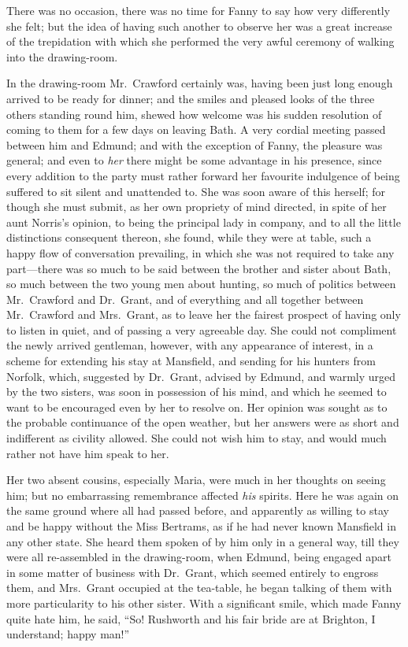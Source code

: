There was no occasion, there was no time for Fanny
to say how very differently she felt; but the idea
of having such another to observe her was a great
increase of the trepidation with which she performed
the very awful ceremony of walking into the drawing-room.

In the drawing-room Mr.\ Crawford certainly was, having been
just long enough arrived to be ready for dinner; and the
smiles and pleased looks of the three others standing
round him, shewed how welcome was his sudden resolution
of coming to them for a few days on leaving Bath.
A very cordial meeting passed between him and Edmund;
and with the exception of Fanny, the pleasure was general;
and even to \emph{her} there might be some advantage in
his presence, since every addition to the party must
rather forward her favourite indulgence of being suffered
to sit silent and unattended to.  She was soon aware
of this herself; for though she must submit, as her
own propriety of mind directed, in spite of her aunt
Norris's opinion, to being the principal lady in company,
and to all the little distinctions consequent thereon,
she found, while they were at table, such a happy flow
of conversation prevailing, in which she was not required
to take any part---there was so much to be said between
the brother and sister about Bath, so much between
the two young men about hunting, so much of politics
between Mr.\ Crawford and Dr.\ Grant, and of everything
and all together between Mr.\ Crawford and Mrs.\ Grant,
as to leave her the fairest prospect of having only to
listen in quiet, and of passing a very agreeable day.
She could not compliment the newly arrived gentleman,
however, with any appearance of interest, in a scheme
for extending his stay at Mansfield, and sending for his
hunters from Norfolk, which, suggested by Dr.\ Grant,
advised by Edmund, and warmly urged by the two sisters,
was soon in possession of his mind, and which he seemed
to want to be encouraged even by her to resolve on.
Her opinion was sought as to the probable continuance
of the open weather, but her answers were as short
and indifferent as civility allowed.  She could not wish
him to stay, and would much rather not have him speak
to her.

Her two absent cousins, especially Maria, were much in her
thoughts on seeing him; but no embarrassing remembrance
affected \emph{his} spirits.  Here he was again on the same
ground where all had passed before, and apparently as
willing to stay and be happy without the Miss Bertrams,
as if he had never known Mansfield in any other state.
She heard them spoken of by him only in a general way,
till they were all re-assembled in the drawing-room,
when Edmund, being engaged apart in some matter of business
with Dr.\ Grant, which seemed entirely to engross them,
and Mrs.\ Grant occupied at the tea-table, he began talking
of them with more particularity to his other sister.
With a significant smile, which made Fanny quite hate him,
he said, ``So!  Rushworth and his fair bride are at Brighton,
I understand; happy man!''

